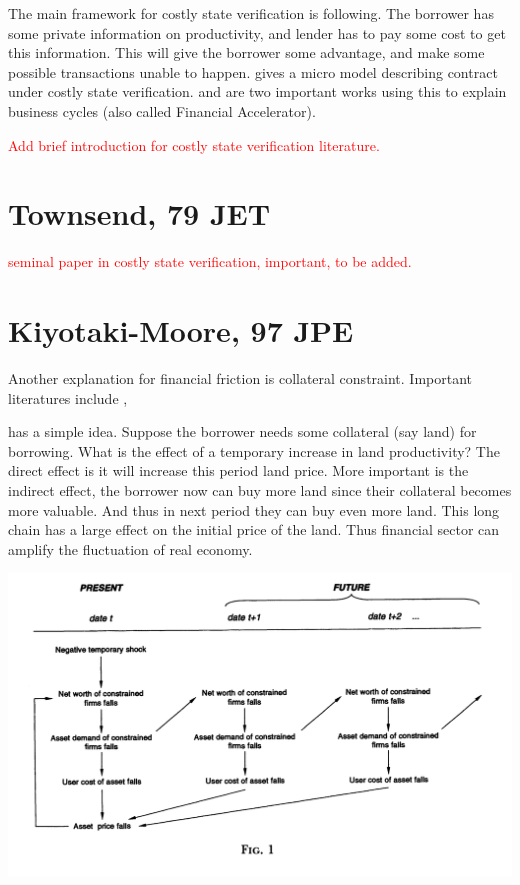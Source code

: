 \documentclass{book}
\theoremstyle{plain}
\theoremstyle{definition}
\begin{document}
The main framework for costly state verification is following. The borrower has some private information on productivity, and lender has to pay some cost to get this information. This will give the borrower some advantage, and make some possible transactions unable to happen. \cite{Townsend:1979ef} gives a micro model describing contract under costly state verification. \cite{BenBernanke:1989eg} and \cite{Carlstrom:1997fb} are two important works using this to explain business cycles (also called Financial Accelerator).

\textcolor{red}{Add brief introduction for costly state verification literature.}




\section{Townsend, 79 JET} %
\label{sec:townsend_79_jet}

\textcolor{red}{seminal paper in costly state verification, important, to be added.}



\section{Kiyotaki-Moore, 97 JPE} %
\label{Kiyotaki_Moore_97_jpe}

\textbf{}


Another explanation for financial friction is collateral constraint. Important literatures include \cite{Kiyotaki:1997hl},

\cite{Kiyotaki:1997hl} has a simple idea. Suppose the borrower needs some collateral (say land) for borrowing. What is the effect of a temporary increase in land productivity? The direct effect is it will increase this period land price. More important is the indirect effect, the borrower now can buy more land since their collateral becomes more valuable. And thus in next period they can buy even more land. This long chain has a large effect on the initial price of the land. Thus financial sector can amplify the fluctuation of real economy.

\includegraphics[width=\textwidth]{kiyotaki-moore-97.png}
\end{document}
